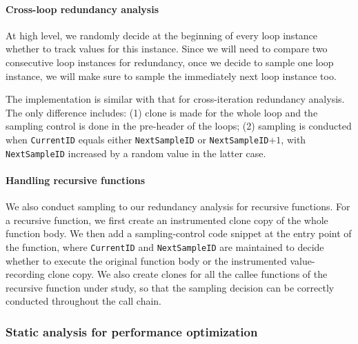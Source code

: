 
\paragraph{Cross-loop redundancy analysis} 
At high level, we randomly decide at the beginning
of every loop instance whether to track values for this instance. 
Since we will need to compare two consecutive loop
instances for redundancy, once we decide to sample one loop instance, we will
make sure to sample the immediately next loop instance too.

The implementation is similar with that for cross-iteration redundancy analysis.
The only difference includes: (1) clone is made for the whole loop and the
sampling control
is done in the pre-header of the loops; (2)
sampling is conducted when \texttt{CurrentID} equals either
\texttt{NextSampleID} or \texttt{NextSampleID}$+1$, with \texttt{NextSampleID}
increased by a random value in the latter case.




\paragraph{Handling recursive functions}
We also conduct sampling to our redundancy analysis for recursive functions.
For a recursive function, we first create an instrumented clone copy of 
the whole function body.
We then add a sampling-control code snippet at the entry point of the function,
where \texttt{CurrentID} and \texttt{NextSampleID} are maintained to decide
whether to execute the original function body or the instrumented 
value-recording clone copy.
We also create clones for all the callee functions of the recursive function
under study, so that the sampling decision can be correctly conducted
throughout the call chain.

\subsubsection{Static analysis for performance optimization}
\label{sec:perf}

